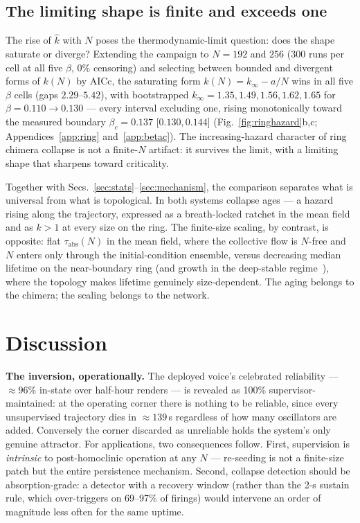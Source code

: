 \documentclass[pdflatex,sn-mathphys,Numbered]{sn-jnl}
\begin{document}
\subsection{The limiting shape is finite and exceeds one}

The rise of $\hat k$ with $N$ poses the thermodynamic-limit question: does the
shape saturate or diverge? Extending the campaign to $N = 192$ and $256$ ($300$
runs per cell at all five $\beta$, $0\%$ censoring) and selecting between
bounded and divergent forms of $k(N)$ by AICc, the saturating form
$k(N) = k_\infty - a/N$ wins in all five $\beta$ cells (gaps $2.29$--$5.42$),
with bootstrapped $k_\infty = 1.35, 1.49, 1.56, 1.62, 1.65$ for
$\beta = 0.110 \to 0.130$ --- every interval excluding one, rising monotonically
toward the measured boundary $\beta_c = 0.137$ [$0.130, 0.144$]
(Fig.~\ref{fig:ringhazard}b,c; Appendices~\ref{app:ring} and~\ref{app:betac}). The
increasing-hazard character of ring chimera collapse is not a finite-$N$
artifact: it survives the limit, with a limiting shape that sharpens toward
criticality.

Together with Secs.~\ref{sec:stats}--\ref{sec:mechanism}, the comparison
separates what is universal from what is topological. In both systems collapse
ages --- a hazard rising along the trajectory, expressed as a breath-locked
ratchet in the mean field and as $k > 1$ at every size on the ring. The
finite-size scaling, by contrast, is opposite: flat $\tau_{\mathrm{abs}}(N)$ in
the mean field, where the collective flow is $N$-free and $N$ enters only
through the initial-condition ensemble, versus decreasing median lifetime on the
near-boundary ring (and growth in the deep-stable regime~\cite{wo2011}), where
the topology makes lifetime genuinely size-dependent. The aging belongs to the
chimera; the scaling belongs to the network.

\section{Discussion}\label{sec:discussion}

\textbf{The inversion, operationally.} The deployed voice's celebrated reliability
--- $\approx 96\%$ in-state over half-hour renders --- is revealed as 100\%
supervisor-maintained: at the operating corner there is nothing to be reliable,
since every unsupervised trajectory dies in $\approx 139$\,s regardless of how many
oscillators are added. Conversely the corner discarded as unreliable holds the
system's only genuine attractor. For applications, two consequences follow. First,
supervision is \emph{intrinsic} to post-homoclinic operation at any $N$ ---
re-seeding is not a finite-size patch but the entire persistence mechanism. Second,
collapse detection should be absorption-grade: a detector with a recovery window
(rather than the 2-s sustain rule, which over-triggers on 69--97\% of firings)
would intervene an order of magnitude less often for the same uptime.
\end{document}
